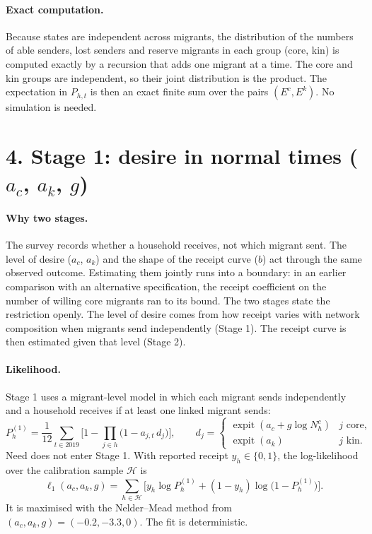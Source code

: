 \documentclass[11pt]{article}
\newcommand{\expit}{\operatorname{expit}}
\begin{document}
\paragraph{Exact computation.} Because states are independent across migrants, the distribution of the numbers of able senders, lost senders and reserve migrants in each group (core, kin) is computed exactly by a recursion that adds one migrant at a time. The core and kin groups are independent, so their joint distribution is the product. The expectation in $P_{h,t}$ is then an exact finite sum over the pairs $(E^c, E^k)$. No simulation is needed.

\section*{4. Stage 1: desire in normal times ($a_c$, $a_k$, $g$)}

\paragraph{Why two stages.} The survey records whether a household receives, not which migrant sent. The level of desire ($a_c$, $a_k$) and the shape of the receipt curve ($b$) act through the same observed outcome. Estimating them jointly runs into a boundary: in an earlier comparison with an alternative specification, the receipt coefficient on the number of willing core migrants ran to its bound. The two stages state the restriction openly. The level of desire comes from how receipt varies with network composition when migrants send independently (Stage 1). The receipt curve is then estimated given that level (Stage 2).

\paragraph{Likelihood.} Stage 1 uses a migrant-level model in which each migrant sends independently and a household receives if at least one linked migrant sends:
\begin{equation}
P^{(1)}_h = \frac{1}{12} \sum_{t \in 2019} \Big[1 - \prod_{j \in h} \big(1 - a_{j,t}\,d_j\big)\Big], \qquad
d_j = \begin{cases} \expit(a_c + g \log N^c_h) & j \text{ core,} \\ \expit(a_k) & j \text{ kin.} \end{cases}
\end{equation}
Need does not enter Stage 1. With reported receipt $y_h \in \{0, 1\}$, the log-likelihood over the calibration sample $\mathcal{H}$ is
\begin{equation}
\ell_1(a_c, a_k, g) = \sum_{h \in \mathcal{H}} \Big[y_h \log P^{(1)}_h + (1 - y_h) \log\big(1 - P^{(1)}_h\big)\Big].
\end{equation}
It is maximised with the Nelder--Mead method from $(a_c, a_k, g) = (-0.2, -3.3, 0)$. The fit is deterministic.
\end{document}
